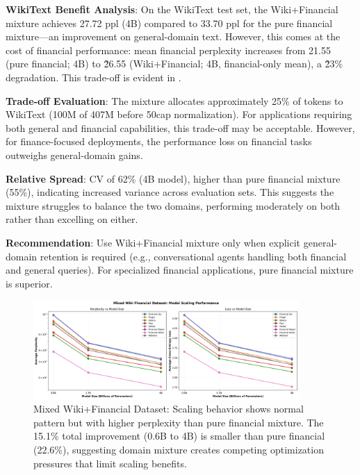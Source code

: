 \textbf{WikiText Benefit Analysis}: On the WikiText test set, the Wiki+Financial mixture achieves 27.72 ppl (4B) compared to 33.70 ppl for the pure financial mixture—an improvement on general-domain text. However, this comes at the cost of financial performance: mean financial perplexity increases from 21.55 (pure financial; 4B) to \~26.55 (Wiki+Financial; 4B, financial-only mean), a \~23\% degradation. This trade-off is evident in .

\textbf{Trade-off Evaluation}: The mixture allocates approximately 25\% of tokens to WikiText (100M of 407M before 50cap normalization). For applications requiring both general and financial capabilities, this trade-off may be acceptable. However, for finance-focused deployments, the performance loss on financial tasks outweighs general-domain gains.

\textbf{Relative Spread}: CV of 62\% (4B model), higher than pure financial mixture (55\%), indicating increased variance across evaluation sets. This suggests the mixture struggles to balance the two domains, performing moderately on both rather than excelling on either.

\textbf{Recommendation}: Use Wiki+Financial mixture only when explicit general-domain retention is required (e.g., conversational agents handling both financial and general queries). For specialized financial applications, pure financial mixture is superior.

\begin{figure}[h]
\centering
\includegraphics[width=0.9\textwidth]{figures/scaling_mixed_wiki_financial.png}
\caption[Mixed Wiki+Financial Dataset: Scaling Behavior]{Mixed Wiki+Financial Dataset: Scaling behavior shows normal pattern but with higher perplexity than pure financial mixture. The 15.1\% total improvement (0.6B to 4B) is smaller than pure financial (22.6\%), suggesting domain mixture creates competing optimization pressures that limit scaling benefits.}
\label{fig:scaling_mixed_wiki_financial}
\end{figure}

